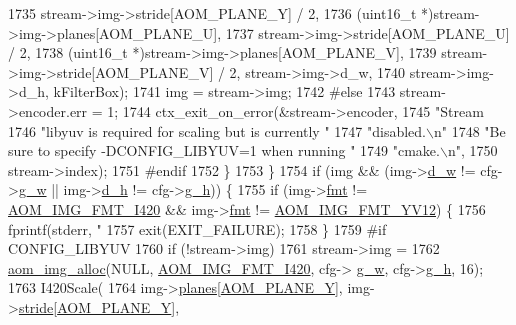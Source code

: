 \begin{DoxyCodeInclude}
{{{{{{{{{{{{{{{{{{{{{{{{{{{{{{{{{{{{{{1735           stream->img->stride[AOM\_PLANE\_Y] / 2,
1736           (uint16\_t *)stream->img->planes[AOM\_PLANE\_U],
1737           stream->img->stride[AOM\_PLANE\_U] / 2,
1738           (uint16\_t *)stream->img->planes[AOM\_PLANE\_V],
1739           stream->img->stride[AOM\_PLANE\_V] / 2, stream->img->d\_w,
1740           stream->img->d\_h, kFilterBox);
1741       img = stream->img;
1742 \textcolor{preprocessor}{#else}
1743       stream->encoder.err = 1;
1744       ctx\_exit\_on\_error(&stream->encoder,
1745           \textcolor{stringliteral}{"Stream %
1746           \textcolor{stringliteral}{"libyuv is required for scaling but is currently "}
1747           \textcolor{stringliteral}{"disabled.\(\backslash\)n"}
1748           \textcolor{stringliteral}{"Be sure to specify -DCONFIG\_LIBYUV=1 when running "}
1749           \textcolor{stringliteral}{"cmake.\(\backslash\)n"},
1750           stream->index);
1751 \textcolor{preprocessor}{#endif}
1752     \}
1753   \}
1754   \textcolor{keywordflow}{if} (img && (img->\hyperlink{structaom__image_a89f80b1f58d608b9d2080635f4359034}{d\_w} != cfg->\hyperlink{structaom__codec__enc__cfg_a80cb459c5ef3c7e1516f617c4c9d6eab}{g\_w} || img->\hyperlink{structaom__image_ab986419a1f0fff93a2dc505f47194988}{d\_h} != cfg->\hyperlink{structaom__codec__enc__cfg_a37b0f57b63bec8d133df8901d4407ee6}{g\_h})) \{
1755     \textcolor{keywordflow}{if} (img->\hyperlink{structaom__image_a6c64b1ab918d80d52eb8f5d6d957e825}{fmt} != \hyperlink{aom__image_8h_a930317c04b4bd0a660bb5e744055523cabd778a3d697463e89d12a1117f417b60}{AOM\_IMG\_FMT\_I420} && img->\hyperlink{structaom__image_a6c64b1ab918d80d52eb8f5d6d957e825}{fmt} != 
      \hyperlink{aom__image_8h_a930317c04b4bd0a660bb5e744055523cad28244100a2754409f285b77a3db90a0}{AOM\_IMG\_FMT\_YV12}) \{
1756       fprintf(stderr, \textcolor{stringliteral}{"%
1757       exit(EXIT\_FAILURE);
1758     \}
1759 \textcolor{preprocessor}{#if CONFIG\_LIBYUV}
1760     \textcolor{keywordflow}{if} (!stream->img)
1761       stream->img =
1762           \hyperlink{aom__image_8h_a570db29fbd122951235a08fe9375f6bb}{aom\_img\_alloc}(NULL, \hyperlink{aom__image_8h_a930317c04b4bd0a660bb5e744055523cabd778a3d697463e89d12a1117f417b60}{AOM\_IMG\_FMT\_I420}, cfg->
      \hyperlink{structaom__codec__enc__cfg_a80cb459c5ef3c7e1516f617c4c9d6eab}{g\_w}, cfg->\hyperlink{structaom__codec__enc__cfg_a37b0f57b63bec8d133df8901d4407ee6}{g\_h}, 16);
1763     I420Scale(
1764         img->\hyperlink{structaom__image_ac54dbc5237ca2914f9ec30105dfbe302}{planes}[\hyperlink{aom__image_8h_a2ad22076006b15cf809edcaa33f6d339}{AOM\_PLANE\_Y}], img->\hyperlink{structaom__image_a6dc693d7dbc9eb06c0cdde307ca58372}{stride}[\hyperlink{aom__image_8h_a2ad22076006b15cf809edcaa33f6d339}{AOM\_PLANE\_Y}],
}}}}}}}}}}}}}}}}}}}}}}}}}}}}}}}}}}}}}}}}
\end{DoxyCodeInclude}
